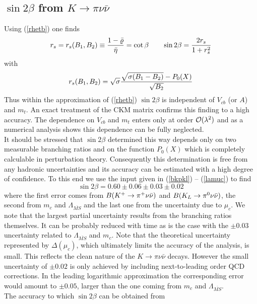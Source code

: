 \subsection{$\sin 2\beta$ from $K\to\pi\nu\bar\nu$}
\label{sec:Kpnn:sin2b}
Using (\ref{rhetb}) one finds \cite{buchallaburas:94c}
\begin{equation}\label{sin}
r_s=r_s(B_1, B_2)\equiv{1-\bar\varrho\over\bar\eta}=\cot\beta \qquad
\sin 2\beta=\frac{2 r_s}{1+r^2_s}
\end{equation}
with
\begin{equation}\label{cbb}
r_s(B_1, B_2)=\sqrt{\sigma}{\sqrt{\sigma(B_1-B_2)}-P_0(X)\over\sqrt{B_2}}
\end{equation}
Thus within the approximation of (\ref{rhetb}) $\sin 2\beta$ is
independent of $V_{cb}$ (or $A$) and $m_t$. An exact treatment of
the CKM matrix confirms this finding to a high accuracy. The
dependence on $V_{cb}$ and $m_t$ enters only at order
${\cal O}(\lambda^2)$ and as a numerical analysis shows this
dependence can be fully neglected.
\\
It should be stressed that $\sin 2\beta$ determined this way depends
only on two measurable branching ratios and on the function
$P_0(X)$ which is completely calculable in perturbation theory.
Consequently this determination is free from any hadronic
uncertainties and its accuracy can be estimated with a high degree
of confidence. To this end we use the input given in
(\ref{bkpkl}) -- (\ref{lamuc}) to find
\begin{equation}\label{sin2bnum}
\sin 2\beta=0.60\pm 0.06\pm 0.03\pm 0.02
\end{equation}
where the first error comes from $B(K^+ \to \pi^+\nu\bar\nu)$ and $B(K_L \to \pi^0\nu\bar\nu)$, the second
from $m_c$ and $\Lambda_{\overline{MS}}$ and the last one from the
uncertainty due to $\mu_c$. We note that the largest partial
uncertainty results from the branching ratios themselves. It can be
probably reduced with time as is the case with the $\pm 0.03$
uncertainty related to $\Lambda_{\overline{MS}}$ and $m_c$.  Note that
the theoretical uncertainty represented by $\Delta(\mu_c)$, which
ultimately limits the accuracy of the analysis, is small.  This
reflects the clean nature of the $K\to\pi\nu\bar\nu$ decays. However
the small uncertainty of $\pm 0.02$ is only achieved by including
next-to-leading order QCD corrections.  In the leading logarithmic
approximation the corresponding error would amount to $\pm 0.05$,
larger than the one coming from $m_c$ and $\Lambda_{\overline{MS}}$.
\\
The accuracy to which $\sin 2\beta$ can be obtained from
